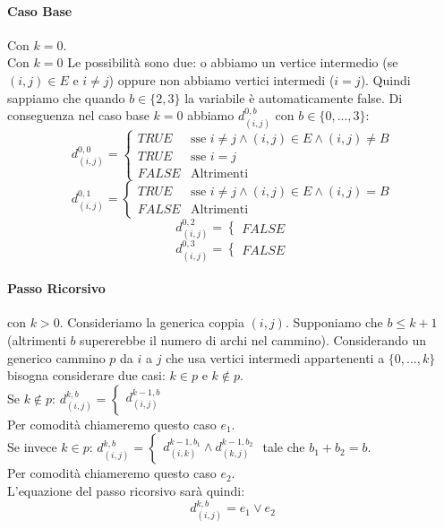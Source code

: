 \documentclass[12pt, a4paper, openany]{book}
\begin{document}
	\paragraph*{Caso Base} Con $k=0$.
	\\Con $k=0$ Le possibilità sono due: o abbiamo un vertice intermedio (se $(i,j)\in E$ e $i\neq j$) oppure non abbiamo vertici intermedi ($i=j$).
	Quindi sappiamo che quando $b\in\{2,3\}$ la variabile è automaticamente false. Di conseguenza nel caso base $k=0$ abbiamo $d_{(i,j)}^{0,b}$ con $b\in \{0,...,3\}$:
$$
	d_{(i,j)}^{0,0}= \begin{cases}
		TRUE  & \text{sse } i\neq j \wedge (i,j)\in E \wedge (i,j) \neq B \\
		TRUE  & \text{sse } i=j                                           \\
		FALSE & \text{Altrimenti}
	\end{cases}
$$
$$
	d_{(i,j)}^{0,1}= \begin{cases}
		TRUE  & \text{sse } i\neq j \wedge (i,j)\in E \wedge (i,j) = B \\
		FALSE & \text{Altrimenti}
	\end{cases}
$$
$$
	d_{(i,j)}^{0,2}= \begin{cases}
		FALSE
	\end{cases}
$$
$$
	d_{(i,j)}^{0,3}= \begin{cases}
		FALSE
	\end{cases}
$$

\paragraph*{Passo Ricorsivo} con $k>0$.
Consideriamo la generica coppia $(i,j)$. Supponiamo che $b\leq k+1$ (altrimenti $b$ supererebbe il numero di archi nel cammino).
Considerando un generico cammino $p$ da $i$ a $j$ che usa vertici intermedi appartenenti a $\{0,...,k\}$ bisogna considerare due casi: $k\in p$ e $k \notin p$.
\\Se $k \notin p$: $d_{(i,j)}^{k,b} = \begin{cases}d_{(i,j)}^{k-1,b} \end{cases}$
\\Per comodità chiameremo questo caso $e_1$.
\\Se invece $k\in p$: $d_{(i,j)}^{k,b} = \begin{cases} d_{(i,k)}^{k-1,b_1} \wedge d_{(k,j)}^{k-1,b_2}\end{cases}$ tale che $b_1 + b_2 = b$.
\\Per comodità chiameremo questo caso $e_2$.
\\L'equazione del passo ricorsivo sarà quindi: $$d_{(i,j)}^{k,b} = e_1 \vee e_2$$
\end{document}
